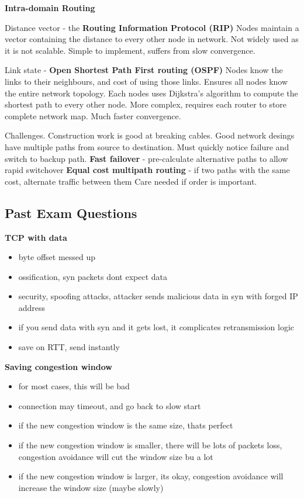 \documentclass{article}
\begin{document}
\vspace{\baselineskip}

\textbf{Intra-domain Routing}

Distance vector {-} the \textbf{Routing Information Protocol (RIP)}
Nodes maintain a vector containing the distance to every other node in network.
Not widely used as it is not scalable. Simple to implement, suffers from slow convergence.

Link state {-} \textbf{Open Shortest Path First routing (OSPF)}
Nodes know the links to their neighbours, and cost of using those links.
Ensures all nodes know the entire network topology.
Each nodes uses Dijkstra's algorithm to compute the shortest path to every other node.
More complex, requires each router to store complete network map. Much faster convergence.

Challenges. Construction work is good at breaking cables. Good network desings have multiple paths from source to destination.
Must quickly notice failure and switch to backup path.
\textbf{Fast failover} {-} pre-calculate alternative paths to allow rapid switchover
\textbf{Equal cost multipath routing} {-} if two paths with the same cost, alternate traffic between them
Care needed if order is important.

\clearpage

\subsection*{Past Exam Questions}

\textbf{TCP with data}
\begin{itemize}
    \item byte offset messed up
    \item ossification, syn packets dont expect data
    \item security, spoofing attacks, attacker sends malicious data in syn with forged IP address
    \item if you send data with syn and it gets lost, it complicates retransmission logic
    \item save on RTT, send instantly
\end{itemize}


\textbf{Saving congestion window}
\begin{itemize}
    \item for most cases, this will be bad
    \item connection may timeout, and go back to slow start
    \item if the new congestion window is the same size, thats perfect
    \item if the new congestion window is smaller, there will be lots of packets loss, congestion avoidance will cut the window size bu a lot
    \item if the new congestion window is larger, its okay, congestion avoidance will increase the window size (maybe slowly)
\end{itemize}
\end{document}

